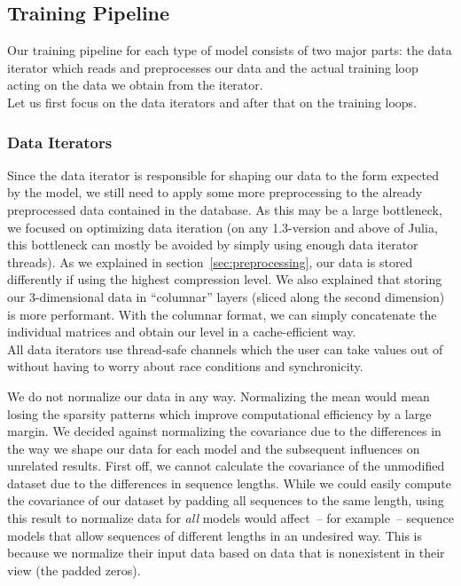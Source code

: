 \subsection{Training Pipeline}
\label{sec:training-pipeline}

Our training pipeline for each type of model consists of two major
parts: the data iterator which reads and preprocesses our data and the
actual training loop acting on the data we obtain from the iterator. \\
Let us first focus on the data iterators and after that on the
training loops.

\subsubsection{Data Iterators}

Since the data iterator is responsible for shaping our data to the
form expected by the model, we still need to apply some more
preprocessing to the already preprocessed data contained in the
database. As this may be a large bottleneck, we focused on optimizing
data iteration (on any 1.3-version and above of Julia, this bottleneck
can mostly be avoided by simply using enough data iterator threads).
As we explained in section~\ref{sec:preprocessing}, our data is stored
differently if using the highest compression level. We also explained
that storing our 3-dimensional data in ``columnar'' layers (sliced
along the second dimension) is more performant. With the columnar
format, we can simply concatenate the individual matrices and obtain
our level in a cache-efficient way. \\
All data iterators use thread-safe channels which the user can take
values out of without having to worry about race conditions and
synchronicity.

We do not normalize our data in any way. Normalizing the mean would
mean losing the sparsity patterns which improve computational
efficiency by a large margin. We decided against normalizing the
covariance due to the differences in the way we shape our data for
each model and the subsequent influences on unrelated results. First
off, we cannot calculate the covariance of the unmodified dataset due
to the differences in sequence lengths. While we could easily compute
the covariance of our dataset by padding all sequences to the same
length, using this result to normalize data for \emph{all} models
would affect~-- for example~-- sequence models that allow sequences of
different lengths in an undesired way. This is because we normalize
their input data based on data that is nonexistent in their view (the
padded zeros).

